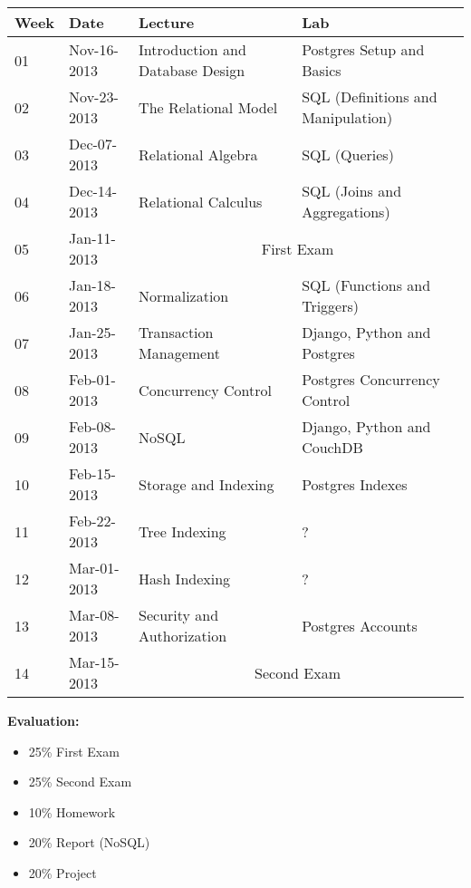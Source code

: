 \documentclass[12pt]{article}
\begin{document}
\begin{center}
  \begin{longtable}{ |l|l|l|l| }
    \hline
    Week & Date & Lecture & Lab \\ \hline
    01 & Nov-16-2013 & 
    	Introduction and Database Design & 
    	Postgres Setup and Basics \\ \hline
    02 & Nov-23-2013 & 
    	The Relational Model &
    	SQL (Definitions and Manipulation) \\ \hline
    03 & Dec-07-2013 & 
    	Relational Algebra & 
    	SQL (Queries) \\ \hline
    04 & Dec-14-2013 & 
    	Relational Calculus &
    	SQL (Joins and Aggregations) \\ \hline
    05 & Jan-11-2013 & 
    	\multicolumn{2}{|c|}{First Exam} \\ \hline
    06 & Jan-18-2013 & 
    	Normalization & 
    	SQL (Functions and Triggers) \\ \hline
    07 & Jan-25-2013 & 
		Transaction Management &
		Django, Python and Postgres  \\ \hline
    08 & Feb-01-2013 & 
		Concurrency Control &
		Postgres Concurrency Control  \\ \hline
    09 & Feb-08-2013 & 
		NoSQL &
    	Django, Python and CouchDB \\ \hline
    10 & Feb-15-2013 & 
	    Storage and Indexing &
		Postgres Indexes \\ \hline
    11 & Feb-22-2013 &
	    Tree Indexing &
		? \\ \hline
    12 & Mar-01-2013 &
	    Hash Indexing &
		? \\ \hline
    13 & Mar-08-2013 &
		Security and Authorization &
    	Postgres Accounts \\ \hline
    14 & Mar-15-2013 & \multicolumn{2}{|c|}{Second Exam}\\
    \hline
  \end{longtable}
\end{center}

\noindent\textbf{Evaluation:} 
\begin{itemize}
  \item[] 25\% First Exam
  \item[] 25\% Second Exam
  \item[] 10\% Homework
  \item[] 20\% Report (NoSQL)
  \item[] 20\% Project
\end{itemize}
\end{document}
